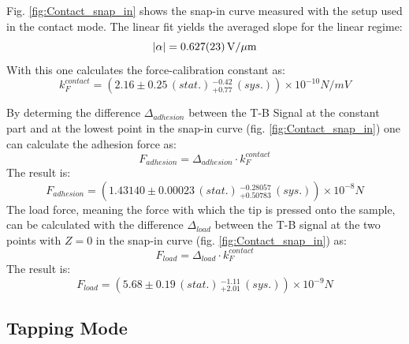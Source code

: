 \documentclass[%
 reprint,
amsmath,amssymb,
pra,
]{revtex4-1}
\begin{document}
Fig. \ref{fig:Contact_snap_in} shows the snap-in curve measured with the setup used in the contact mode. The linear fit yields the averaged slope for the linear regime:
\begin{equation*}
|\alpha| = \SI{0.627 \pm 0.023}{V \per \mu m}
\end{equation*}
With this one calculates the force-calibration constant as:
\begin{equation*}
k_F^{contact} = (2.16 \pm 0.25 \, (stat.) \, _{+ 0.77} ^{- 0.42} \, (sys.)) \times 10^{-10} \si{N \per mV}
\end{equation*}

By determing the difference $\Delta _{adhesion}$ between the T-B Signal at the constant part and at the lowest point in the snap-in curve (fig. \ref{fig:Contact_snap_in}) one can calculate the adhesion force as:
\begin{equation*}
F_{adhesion} = \Delta _{adhesion} \cdot k_F^{contact}
\end{equation*}
The result is:
\begin{equation*}
F_{adhesion} = (1.43140 \pm 0.00023 \, (stat.) \, _{+ 0.50783} ^{- 0.28057} \, (sys.)) \times 10^{-8} \si{N}
\end{equation*}
The load force, meaning the force with which the tip is pressed onto the sample, can be calculated with the difference $\Delta _{load}$ between the T-B signal at the two points with $Z=0$ in the snap-in curve (fig. \ref{fig:Contact_snap_in}) as:
\begin{equation*}
F_{load} = \Delta _{load} \cdot k_F^{contact}
\end{equation*}
The result is:
\begin{equation*}
F_{load} = (5.68 \pm 0.19 \, (stat.) \, _{+ 2.01} ^{- 1.11} \, (sys.)) \times 10^{-9} \si{N}
\end{equation*}
\subsection{Tapping Mode}
\end{document}
